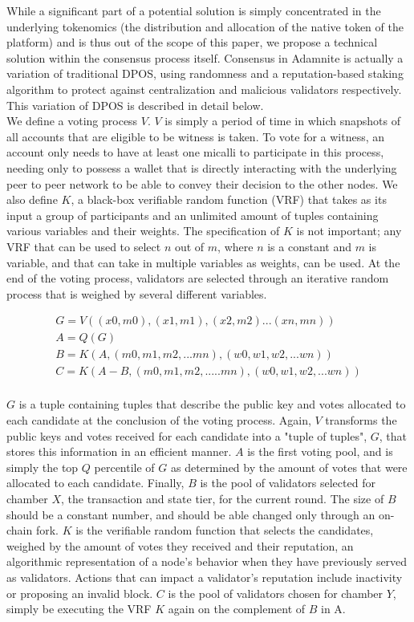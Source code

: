 \documentclass[conference]{IEEEtran}
\begin{document}
While a significant part of a potential solution is simply concentrated in the underlying tokenomics (the distribution and allocation of the native token of the platform) and is thus out of the scope of this paper, we propose a technical solution within the consensus process itself. Consensus in Adamnite is actually a variation of traditional DPOS, using randomness and a reputation-based staking algorithm to protect against centralization and malicious validators respectively. This variation of DPOS is described in detail below.\\

We define a voting process $V$. $V$ is simply a period of time in which snapshots of all accounts that are eligible to be witness is taken. To vote for a witness, an account only needs to have at least one micalli to participate in this process, needing only to possess a wallet that is directly interacting with the underlying peer to peer network to be able to convey their decision to the other nodes. We also define $K$, a black-box verifiable random function (VRF) that takes as its input a group of participants and an unlimited amount of tuples containing various variables and their weights. The specification of $K$ is not important; any VRF that can be used to select $n$ out of $m$, where $n$ is a constant and $m$ is variable, and that can take in multiple variables as weights, can be used.  At the end of the voting process, validators are selected through an iterative random process that is weighed by several different variables. 

\begin{eqnarray}
G = V((x0,m0),(x1,m1),(x2,m2)...(xn,mn))\\
A = Q(G)\\
B = K(A, (m0,m1,m2,...mn), (w0,w1,w2,...wn))\\
C = K(A-B, (m0,m1,m2,.....mn), (w0,w1,w2,...wn))\\
\end{eqnarray}

$G$ is a tuple containing tuples that describe the public key and votes allocated to each candidate at the conclusion of the voting process. Again, $V$ transforms the public keys and votes received for each candidate into a "tuple of tuples", $G$, that stores this information in an efficient manner. $A$ is the first voting pool, and is simply the top $Q$ percentile of $G$ as determined by the amount of votes that were allocated to each candidate. Finally, $B$ is the pool of validators selected for chamber $X$, the transaction and state tier, for the current round. The size of $B$ should be a constant number, and should be able changed only through an on-chain fork.  $K$ is the verifiable random function that selects the candidates, weighed by the amount of votes they received and their reputation, an algorithmic representation of a node's behavior when they have previously served as validators. Actions that can impact a validator's reputation include inactivity or proposing an invalid block. $C$ is the pool of validators chosen for chamber $Y$, simply be executing the VRF $K$ again on the complement of $B$ in A. 
\end{document}
